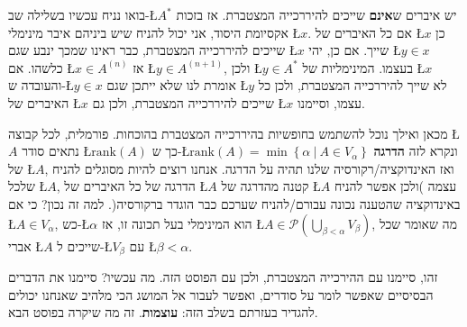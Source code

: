 \documentclass[english,hebrew]{article}
\begin{document}
בואו נניח עכשיו בשלילה שב-\L{$A^{*}$} יש איברים ש\textbf{אינם} שייכים
להיררכייה המצטברת. אז בזכות אקסיומת היסוד, אני יכול להניח שיש ביניהם
איבר מינימלי \L{$x$}. אם כל האיברים של \L{$x$} כן שייכים להיררכייה
המצטברת, כבר ראינו שמכך ינבע שגם \L{$x$} שייך. אם כן, יהי \L{$y\in x$}
כלשהו. אם \L{$x\in A^{\left(n\right)}$} אז \L{$y\in A^{\left(n+1\right)}$},
ולכן \L{$y\in A^{*}$} בעצמו. המינימליות של \L{$x$} והעובדה ש-\L{$y\in x$}
אומרת לנו שלא ייתכן שגם \L{$y$} לא שייך להיררכייה המצטברת, ולכן כל
האיברים של \L{$x$} שייכים להיררכייה המצטברת, ולכן גם \L{$x$} עצמו,
וסיימנו.

מכאן ואילך נוכל להשתמש בחופשיות בהיררכייה המצטברת בהוכחות. פורמלית,
לכל קבוצה \L{$A$} נתאים סודר \L{$\text{rank}\left(A\right)$} כך
ש-\L{$\text{rank}\left(A\right)=\min\left\{ \alpha\ |\ A\in V_{\alpha}\right\} $}
ונקרא לזה \textbf{הדרגה} של \L{$A$}, ואז האינדוקציה/רקורסיה שלנו
תהיה על הדרגה. אנחנו רוצים להיות מסוגלים להניח שלכל \L{$A$}, הדרגה
של כל האיברים של \L{$A$} קטנה מהדרגה של \L{$A$} עצמה )ולכן אפשר
להניח באינדוקציה שהטענה נכונה עבורם/להניח שערכם כבר הוגדר ברקורסיה(.
למה זה נכון? כי אם \L{$A\in V_{\alpha}$}, כש-\L{$\alpha$} הוא המינימלי
בעל תכונה זו, אז \L{$A\in\mathcal{P}\left(\bigcup_{\beta<\alpha}V_{\beta}\right)$},
מה שאומר שכל אברי \L{$A$} שייכים ל-\L{$V_{\beta}$} עם \L{$\beta<\alpha$}.

זהו, סיימנו עם ההירכייה המצטברת, ולכן עם הפוסט הזה. מה עכשיו? סיימנו
את הדברים הבסיסיים שאפשר לומר על סודרים, ואפשר לעבור אל המושג הכי
מלהיב שאנחנו יכולים להגדיר בעזרתם בשלב הזה: \textbf{עוצמות}. זה מה
שיקרה בפוסט הבא.
\end{document}
